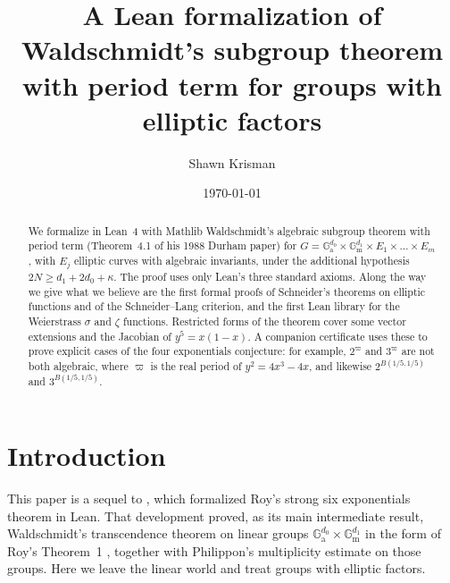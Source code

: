 \documentclass[11pt]{amsart}
\theoremstyle{definition}
\theoremstyle{remark}
\numberwithin{equation}{section}
\newcommand{\Ga}{\mathbb{G}_{\mathrm{a}}}
\newcommand{\Gm}{\mathbb{G}_{\mathrm{m}}}
\newcommand{\vp}{\varpi}
\begin{document}
\title[Waldschmidt's subgroup theorem with period term in Lean]{A Lean formalization of Waldschmidt's
subgroup theorem with period term for groups with elliptic factors}

\author{Shawn Krisman}


\date{\today}

\begin{abstract}
We formalize in Lean~4 with Mathlib Waldschmidt's algebraic subgroup theorem with period term
(Theorem~4.1 of his 1988 Durham paper) for $G=\Ga^{d_0}\times\Gm^{d_1}\times E_1\times\dots\times E_m$,
with $E_j$ elliptic curves with algebraic invariants, under the additional hypothesis
$2N\ge d_1+2d_0+\kappa$. The proof uses only Lean's three standard axioms. Along the way we give what we
believe are the first formal proofs of Schneider's theorems on elliptic functions and of the
Schneider--Lang criterion, and the first Lean library for the Weierstrass $\sigma$ and $\zeta$ functions.
Restricted forms of the theorem cover some vector extensions and the Jacobian of $y^5=x(1-x)$. A companion
certificate uses these to prove explicit cases of the four exponentials conjecture: for example,
$2^{\vp}$ and $3^{\vp}$ are not both algebraic, where $\vp$ is the real period of $y^2=4x^3-4x$, and
likewise $2^{B(1/5,1/5)}$ and $3^{B(1/5,1/5)}$.
\end{abstract}

\maketitle

\section{Introduction}\label{sec:intro}

This paper is a sequel to \cite{StrongSixPaper}, which formalized Roy's strong six exponentials
theorem in Lean. That development proved, as its main intermediate result, Waldschmidt's
transcendence theorem on linear groups $\Ga^{d_0}\times\Gm^{d_1}$ in the form of Roy's Theorem~1
\cite{Roy1992}, together with Philippon's multiplicity estimate on those groups. Here we leave the
linear world and treat groups with elliptic factors.
\end{document}
